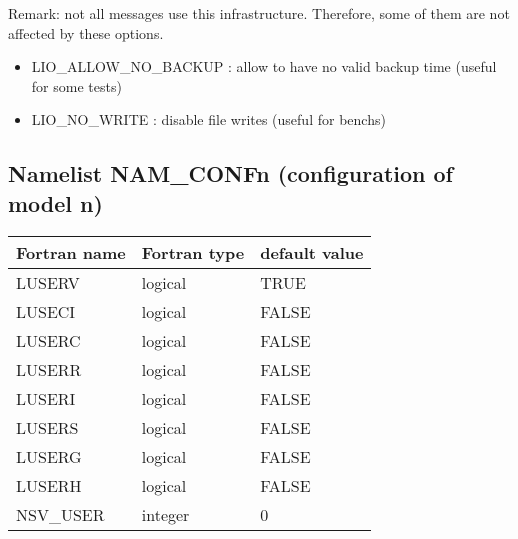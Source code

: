 Remark: not all messages use this infrastructure. Therefore, some of them are not affected by these options.

\begin{itemize}

\item
LIO\_ALLOW\_NO\_BACKUP : allow to have no valid backup time (useful for some tests)

\item
LIO\_NO\_WRITE : disable file writes (useful for benchs)

\end{itemize}


\subsection{Namelist NAM\_CONFn (configuration of model n)}

\begin{center}
\begin{tabular} {|l|l|l|}
\hline
Fortran name & Fortran type & default value \\
\hline
LUSERV   & logical & TRUE  \\
LUSECI   & logical  & FALSE  \\
LUSERC   & logical  & FALSE  \\
LUSERR   & logical  & FALSE  \\
LUSERI   & logical  & FALSE  \\
LUSERS   & logical  & FALSE  \\
LUSERG   & logical  & FALSE  \\
LUSERH   & logical  & FALSE  \\
NSV\_USER & integer  & 0\\
\hline
\end{tabular}
\end{center}


